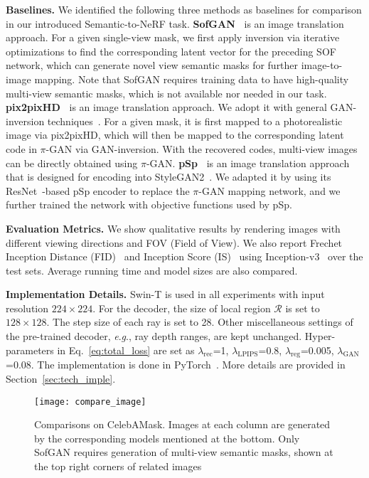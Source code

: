 \documentclass[runningheads]{llncs}
\newcommand{\eg}{\textit{e}.\textit{g}.}
\begin{document}
\noindent\textbf{Baselines.} We identified the following three methods as baselines for comparison in our introduced Semantic-to-NeRF task.
\textbf{SofGAN~\cite{chen2022sofgan}} is an image translation approach. For a given single-view mask, we first apply inversion via iterative optimizations to find the corresponding latent vector for the preceding SOF~\cite{chen2019learning} network, which can generate novel view semantic masks for further image-to-image mapping. Note that SofGAN requires training data to have high-quality multi-view semantic masks, which is not available nor needed in our task. \textbf{pix2pixHD~\cite{wang2018high}} is an image translation approach. We adopt it with general GAN-inversion techniques~\cite{chan2021pi,karras2020analyzing}. For a given mask, it is first mapped to a photorealistic image via pix2pixHD, which will then be mapped to the corresponding latent code in $\pi$-GAN via GAN-inversion. With the recovered codes, multi-view images can be directly obtained using $\pi$-GAN.    
\textbf{pSp~\cite{richardson2021encoding}} is an image translation approach that is designed for encoding into StyleGAN2~\cite{karras2020analyzing}. We adapted it by using its ResNet~\cite{he2016deep}-based pSp encoder to replace the $\pi$-GAN mapping network, and we further trained the network with objective functions used by pSp.

\noindent\textbf{Evaluation Metrics.}
We show qualitative results by rendering images with different viewing directions and FOV (Field of View). 
We also report Frechet Inception Distance (FID)~\cite{heusel2017gans} and Inception Score (IS)~\cite{salimans2016improved} using Inception-v3~\cite{szegedy2016rethinking} over the test sets. 
Average running time and model sizes are also compared.

\noindent\textbf{Implementation Details.} Swin-T is used in all experiments with input resolution $224 \times 224$. For the decoder, the size of local region $\mathcal{R}$ is set to $128 \times 128$. The step size of each ray is set to 28. Other miscellaneous settings of the pre-trained decoder, \eg, ray depth ranges, are kept unchanged. Hyper-parameters in Eq.~\eqref{eq:total_loss} are set as $\lambda_{\text{rec}}$=1, $\lambda_{\text{LPIPS}}$=0.8, $\lambda_{\text{reg}}$=0.005, $\lambda_{\text{GAN}}$=0.08. The implementation is done in PyTorch~\cite{paszke2019pytorch}. More details are provided in Section~\ref{sec:tech_imple}. 



\begin{figure}[t!]
    \centering
    \texttt{[image: compare\_image]} 
    \caption{Comparisons on CelebAMask. Images at each column are generated by the corresponding models mentioned at the bottom. Only SofGAN requires generation of multi-view semantic masks, shown at the top right corners of related images}
    \label{fig:compare_image}
\end{figure}
\end{document}
